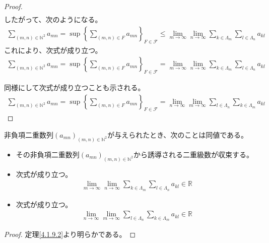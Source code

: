 \documentclass[dvipdfmx]{jsarticle}
\begin{document}
\begin{proof}
\begin{align*}
\end{align*}
したがって、次のようになる。
\begin{align*}
\sum_{(m,n) \in \mathbb{N}^{2}}a_{mn} = \sup\left\{ \sum_{(m,n) \in F}a_{mn} \right\}_{F \in \mathcal{F}} \leq \lim_{m \rightarrow \infty}{\lim_{n \rightarrow \infty}{\sum_{k \in \varLambda_{m}}{\sum_{l \in \varLambda_{n}}a_{kl}}}}
\end{align*}
これにより、次式が成り立つ。
\begin{align*}
\sum_{(m,n) \in \mathbb{N}^{2}}a_{mn} = \sup\left\{ \sum_{(m,n) \in F}a_{mn} \right\}_{F \in \mathcal{F}} = \lim_{m \rightarrow \infty}{\lim_{n \rightarrow \infty}{\sum_{k \in \varLambda_{m}}{\sum_{l \in \varLambda_{n}}a_{kl}}}}
\end{align*}\par
同様にして次式が成り立つことも示される。
\begin{align*}
\sum_{(m,n) \in \mathbb{N}^{2}}a_{mn} = \sup\left\{ \sum_{(m,n) \in F}a_{mn} \right\}_{F \in \mathcal{F}} = \lim_{n \rightarrow \infty}{\lim_{m \rightarrow \infty}{\sum_{l \in \varLambda_{n}}{\sum_{k \in \varLambda_{m}}a_{kl}}}}
\end{align*}
\end{proof}
\begin{thm}\label{4.1.9.3}
非負項二重数列$\left( a_{mn} \right)_{(m,n) \in \mathbb{N}^{2}}$が与えられたとき、次のことは同値である。
\begin{itemize}
\item
  その非負項二重数列$\left( a_{mn} \right)_{(m,n) \in \mathbb{N}^{2}}$から誘導される二重級数が収束する。
\item
  次式が成り立つ。
\begin{align*}
\lim_{m \rightarrow \infty}{\lim_{n \rightarrow \infty}{\sum_{k \in \varLambda_{m}}{\sum_{l \in \varLambda_{n}}a_{kl}}}} \in \mathbb{R}
\end{align*}
\item
  次式が成り立つ。
\begin{align*}
\lim_{n \rightarrow \infty}{\lim_{m \rightarrow \infty}{\sum_{l \in \varLambda_{n}}{\sum_{k \in \varLambda_{m}}a_{kl}}}} \in \mathbb{R}
\end{align*}
\end{itemize}
\end{thm}
\begin{proof} 定理\ref{4.1.9.2}より明らかである。
\end{proof}
\end{document}
